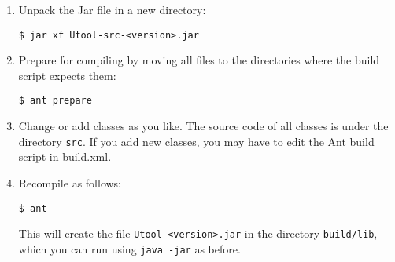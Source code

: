 \begin{enumerate}
\item Unpack the Jar file in a new directory:
\begin{verbatim}
$ jar xf Utool-src-<version>.jar
\end{verbatim}

\item Prepare for compiling by moving all files to the directories
where the build script expects them:
\begin{verbatim}
$ ant prepare
\end{verbatim}

\item Change or add classes as you like. The source code of all
classes is under the directory \verb?src?. If you add new classes, you
may have to edit the Ant build script in \url{build.xml}.

\item Recompile as follows:
\begin{verbatim}
$ ant
\end{verbatim}

This will create the file \verb?Utool-<version>.jar? in the directory
\verb?build/lib?, which you can run using \verb?java -jar?  as before.



\end{enumerate}






